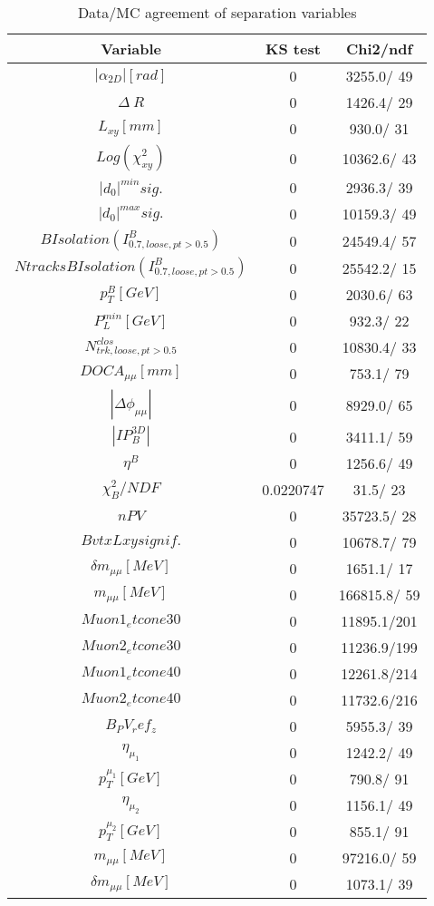 \documentclass{article}
\begin{document}
\begin{table}[htbp]
\caption{\label{tab:sepVars}Data/MC agreement of separation variables}
\begin{center}
\begin{tabular}{c|c|c}
Variable & KS test & Chi2/ndf \\
\hline
$|\alpha_{2D}| [rad]$ & 0 & 3255.0/ 49\\
\hline
$\Delta~R$ & 0 & 1426.4/ 29\\
\hline
$L_{xy} [mm]$ & 0 & 930.0/ 31\\
\hline
$Log(\chi^{2}_{xy})$ & 0 & 10362.6/ 43\\
\hline
$|d_{0}|^{min} sig.$ & 0 & 2936.3/ 39\\
\hline
$|d_{0}|^{max} sig.$ & 0 & 10159.3/ 49\\
\hline
$B Isolation (I^{B}_{0.7, loose, pt>0.5})$ & 0 & 24549.4/ 57\\
\hline
$Ntracks B Isolation (I^{B}_{0.7, loose, pt>0.5})$ & 0 & 25542.2/ 15\\
\hline
$p_{T}^{B} [GeV]$ & 0 & 2030.6/ 63\\
\hline
$P^{min}_{L} [GeV]$ & 0 & 932.3/ 22\\
\hline
$N^{clos}_{trk, loose, pt>0.5}$ & 0 & 10830.4/ 33\\
\hline
$DOCA_{\mu\mu} [mm]$ & 0 & 753.1/ 79\\
\hline
$|\Delta\phi_{\mu\mu}|$ & 0 & 8929.0/ 65\\
\hline
$|IP_{B}^{3D}|$ & 0 & 3411.1/ 59\\
\hline
$\eta^{B}$ & 0 & 1256.6/ 49\\
\hline
$\chi^{2}_{B}/NDF$ & 0.0220747 &  31.5/ 23\\
\hline
$nPV$ & 0 & 35723.5/ 28\\
\hline
$BvtxLxy signif.$ & 0 & 10678.7/ 79\\
\hline
$\delta m_{\mu\mu} [MeV]$ & 0 & 1651.1/ 17\\
\hline
$m_{\mu\mu} [MeV]$ & 0 & 166815.8/ 59\\
\hline
$Muon1_etcone30$ & 0 & 11895.1/201\\
\hline
$Muon2_etcone30$ & 0 & 11236.9/199\\
\hline
$Muon1_etcone40$ & 0 & 12261.8/214\\
\hline
$Muon2_etcone40$ & 0 & 11732.6/216\\
\hline
$B_PV_ref_z$ & 0 & 5955.3/ 39\\
\hline
$\eta_{\mu_{1}}$ & 0 & 1242.2/ 49\\
\hline
$p_{T}^{\mu_{1}} [GeV]$ & 0 & 790.8/ 91\\
\hline
$\eta_{\mu_{2}}$ & 0 & 1156.1/ 49\\
\hline
$p_{T}^{\mu_{2}} [GeV]$ & 0 & 855.1/ 91\\
\hline
$m_{\mu\mu} [MeV]$ & 0 & 97216.0/ 59\\
\hline
$\delta m_{\mu\mu} [MeV]$ & 0 & 1073.1/ 39\\
\hline
\end{tabular}
\end{center}
\end{table}
\end{document}
